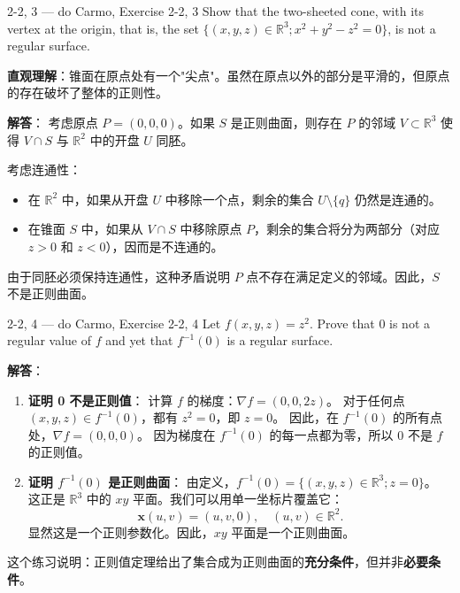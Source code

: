 \begin{exercise}{2-2, 3 — do Carmo, Exercise 2-2, 3}
Show that the two-sheeted cone, with its vertex at the origin, that is, the set $\{(x,y,z)\in \mathbb{R}^3;x^2 +y^2 -z^2 = 0\}$, is not a regular surface.
\end{exercise}

\begin{solution}
\textbf{直观理解}：锥面在原点处有一个"尖点"。虽然在原点以外的部分是平滑的，但原点的存在破坏了整体的正则性。

\textbf{解答}：
考虑原点 $P = (0, 0, 0)$。如果 $S$ 是正则曲面，则存在 $P$ 的邻域 $V \subset \mathbb{R}^3$ 使得 $V \cap S$ 与 $\mathbb{R}^2$ 中的开盘 $U$ 同胚。

考虑连通性：
\begin{itemize}
    \item 在 $\mathbb{R}^2$ 中，如果从开盘 $U$ 中移除一个点，剩余的集合 $U \setminus \{q\}$ 仍然是连通的。
    \item 在锥面 $S$ 中，如果从 $V \cap S$ 中移除原点 $P$，剩余的集合将分为两部分（对应 $z > 0$ 和 $z < 0$），因而是不连通的。
\end{itemize}
由于同胚必须保持连通性，这种矛盾说明 $P$ 点不存在满足定义的邻域。因此，$S$ 不是正则曲面。
\end{solution}

\begin{exercise}{2-2, 4 — do Carmo, Exercise 2-2, 4}
Let $f(x, y, z) = z^2$. Prove that $0$ is not a regular value of $f$ and yet that $f^{-1}(0)$ is a regular surface.
\end{exercise}

\begin{solution}
\textbf{解答}：
\begin{enumerate}
    \item \textbf{证明 0 不是正则值}：
    计算 $f$ 的梯度：$\nabla f = (0, 0, 2z)$。
    对于任何点 $(x, y, z) \in f^{-1}(0)$，都有 $z^2 = 0$，即 $z = 0$。
    因此，在 $f^{-1}(0)$ 的所有点处，$\nabla f = (0, 0, 0)$。
    因为梯度在 $f^{-1}(0)$ 的每一点都为零，所以 $0$ 不是 $f$ 的正则值。

    \item \textbf{证明 $f^{-1}(0)$ 是正则曲面}：
    由定义，$f^{-1}(0) = \{(x, y, z) \in \mathbb{R}^3; z = 0\}$。
    这正是 $\mathbb{R}^3$ 中的 $xy$ 平面。我们可以用单一坐标片覆盖它：
    \[
    \mathbf{x}(u, v) = (u, v, 0), \quad (u, v) \in \mathbb{R}^2.
    \]
    显然这是一个正则参数化。因此，$xy$ 平面是一个正则曲面。
\end{enumerate}
这个练习说明：正则值定理给出了集合成为正则曲面的\textbf{充分条件}，但并非\textbf{必要条件}。
\end{solution}

